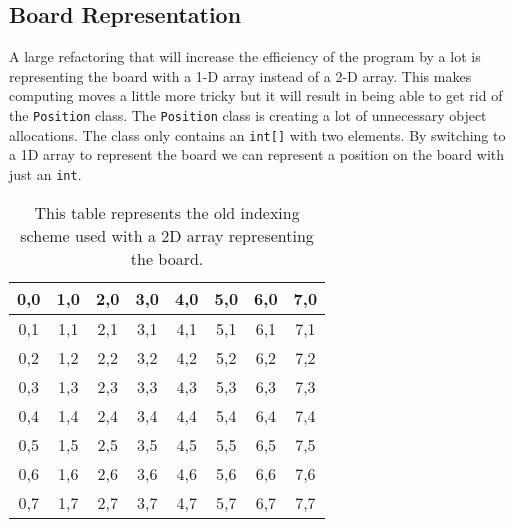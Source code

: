 \documentclass[sigconf]{acmart}
\begin{document}
\subsection{Board Representation}
A large refactoring that will increase the efficiency of the program by a lot is representing the board with a 1-D array instead of a 2-D array.
This makes computing moves a little more tricky but it will result in being able to get rid of the \texttt{Position} class.
The \texttt{Position} class is creating a lot of unnecessary object allocations.
The class only contains an \texttt{int[]} with two elements.
By switching to a 1D array to represent the board we can represent a position on the board with just an \texttt{int}.
\begin{table}[H]
    \renewcommand{\arraystretch}{1.5}
    \setlength{\arrayrulewidth}{1pt}
    \setlength{\tabcolsep}{4pt}
    \begin{tabular}{|c|c|c|c|c|c|c|c|}
        \hline
        0,0  & 1,0  & 2,0  & 3,0  & 4,0  & 5,0  & 6,0  & 7,0  \\
        \hline
        0,1  & 1,1  & 2,1  & 3,1  & 4,1  & 5,1  & 6,1  & 7,1  \\
        \hline
        0,2  & 1,2  & 2,2  & 3,2  & 4,2  & 5,2  & 6,2  & 7,2  \\
        \hline
        0,3  & 1,3  & 2,3  & 3,3  & 4,3  & 5,3  & 6,3  & 7,3  \\
        \hline
        0,4  & 1,4  & 2,4  & 3,4  & 4,4  & 5,4  & 6,4  & 7,4  \\
        \hline
        0,5  & 1,5  & 2,5  & 3,5  & 4,5  & 5,5  & 6,5  & 7,5  \\
        \hline
        0,6  & 1,6  & 2,6  & 3,6  & 4,6  & 5,6  & 6,6  & 7,6  \\
        \hline
        0,7  & 1,7  & 2,7  & 3,7  & 4,7  & 5,7  & 6,7  & 7,7  \\
        \hline
    \end{tabular}
    \caption{This table represents the old indexing scheme used with a 2D array representing the board.}
    \label{tab:example_table}
\end{table} 
\end{document}
